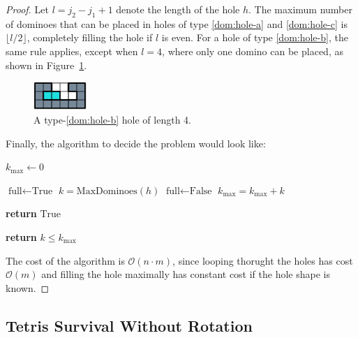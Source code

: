 \begin{proof}
Let \( l = j_2 - j_1 + 1 \) denote the length of the hole \( h \). The maximum number of dominoes that can be placed in holes of type \ref{dom:hole-a} and \ref{dom:hole-c} is \( \lfloor l / 2 \rfloor \), completely filling the hole if \( l \) is even. For a hole of type \ref{dom:hole-b}, the same rule applies, except when \( l = 4 \), where only one domino can be placed, as shown in Figure~\ref{dom:hole-4}.

\begin{figure}[h]
    \centering
    \includegraphics[width=0.18\textwidth]{./pictures/dominoes/hole-4.pdf}
    \caption{A type-\ref{dom:hole-b} hole of length 4.}
    \label{dom:hole-4} 
\end{figure}

Finally, the algorithm to decide the problem would look like:
\begin{algorithmic}[1]
     
    \State $k_{\max}\gets 0$ 

    \State $\text{full} \gets \text{True}$
        \State $k = \text{MaxDominoes}(h)$ 
          \State $\text{full} \gets \text{False}$
        \EndIf
        \State $k_{\max} = k_{\max} + k$
      \EndFor

        \State \textbf{return} $\text{True}$ 
    \EndIf
\EndFor

\State \textbf{return} $k \leq k_{\max}$
\EndFunction
\end{algorithmic}

The cost of the algorithm is $\mathcal{O}(n \cdot m)$, since looping thorught the holes has cost $\mathcal{O}(m)$ and filling the hole maximally has constant cost if the hole shape is known.

\end{proof}


\subsection{Tetris Survival Without Rotation}

